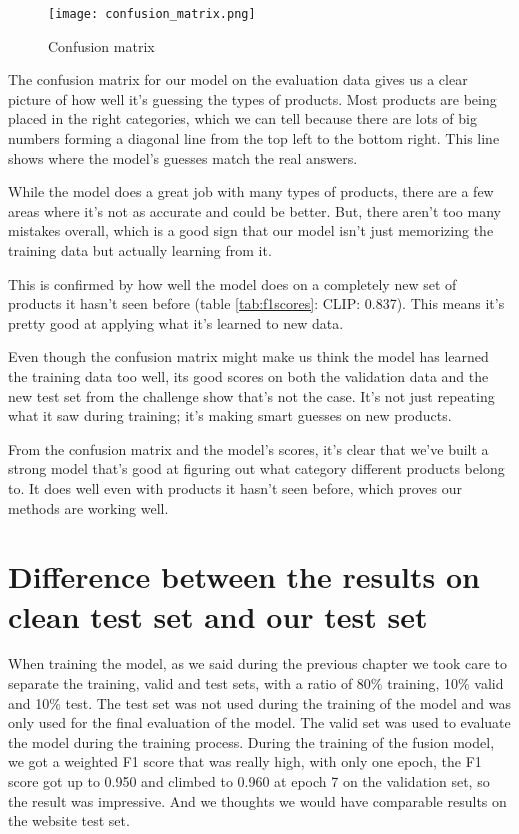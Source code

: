 \begin{figure}[H]
	\centering
	\texttt{[image: confusion\_matrix.png]}
	\caption{Confusion matrix}
	\label{fig:confusionmatrix}
\end{figure}

The confusion matrix for our model on the evaluation data gives us a clear picture of how well it's guessing the types of products. Most products are being placed in the right categories, which we can tell because there are lots of big numbers forming a diagonal line from the top left to the bottom right. This line shows where the model's guesses match the real answers.

While the model does a great job with many types of products, there are a few areas where it's not as accurate and could be better. But, there aren't too many mistakes overall, which is a good sign that our model isn't just memorizing the training data but actually learning from it.

This is confirmed by how well the model does on a completely new set of products it hasn't seen before (table \ref*{tab:f1scores}: CLIP: 0.837). This means it's pretty good at applying what it's learned to new data.

Even though the confusion matrix might make us think the model has learned the training data too well, its good scores on both the validation data and the new test set from the challenge show that's not the case. It's not just repeating what it saw during training; it's making smart guesses on new products.

From the confusion matrix and the model's scores, it's clear that we've built a strong model that's good at figuring out what category different products belong to. It does well even with products it hasn't seen before, which proves our methods are working well.


\section{Difference between the results on clean test set and our test set}

When training the model, as  we said during the previous chapter we took care to separate the training, valid and test sets, with a ratio of 80\% training, 10\% valid and 10\% test. The test set was not used during the training of the model and was only used for the final evaluation of the model. The valid set was used to evaluate the model during the training process. During the training of the fusion model, we got a weighted F1 score that was really high, with only one epoch, the F1 score got up to 0.950 and climbed to 0.960 at epoch 7 on the validation set, so the result was impressive. And we thoughts we would have comparable results on the website test set.


